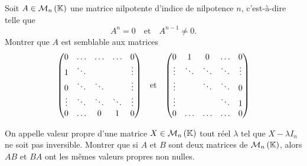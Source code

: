 \documentclass{magnolia}
\begin{document}
Soit $A\in\mathcal{M}_{n}\left(\mathbb{K}\right)$ une matrice nilpotente d'indice de nilpotence $n$,
c'est-à-dire telle que
\[A^n=0 \quad \text{et} \quad A^{n-1}\not=0.\]
Montrer que $A$ est semblable aux matrices
\[\begin{pmatrix}
  0       & \dots  & \dots  & \dots  & 0\\
  1       & \ddots &        &        & \vdots\\
  0       & \ddots & \ddots &        & \vdots\\
  \vdots  & \ddots & \ddots & \ddots & \vdots\\
  0       & \dots  & 0      & 1      & 0
  \end{pmatrix}\quad\!\text{et}\quad\!
  \begin{pmatrix}
  0       & 1      & 0      & \dots  & 0\\
  \vdots  & \ddots & \ddots & \ddots & \vdots\\
  \vdots  &        & \ddots & \ddots & 0\\
  \vdots  &        &        & \ddots & 1\\
  0       & \dots  & \dots  & \dots  & 0
  \end{pmatrix}\]

On appelle valeur propre d'une matrice $X\in\mathcal{M}_{n}\left(\mathbb{K}\right)$ tout réel
$\lambda$ tel que $X-\lambda I_n$ ne soit pas inversible. Montrer que si $A$
et $B$ sont deux matrices de $\mathcal{M}_{n}\left(\mathbb{K}\right)$, alors $AB$ et $BA$ ont les
mêmes valeurs propres non nulles.

\end{document}
